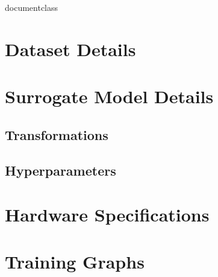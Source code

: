 \csname documentclass

\appendix
\chapter{Dataset Details}\label{appendix:datasets}

\chapter{Surrogate Model Details}

\section{Transformations}\label{appendix:transformations}

\section{Hyperparameters}\label{appendix:surrogate-hyperparameters}

\chapter{Hardware Specifications}

\chapter{Training Graphs}
